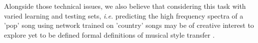 \documentclass{article}
\begin{document}



Alongside those technical issues, we also believe that considering this task with varied learning and testing sets, \textit{i.e.} predicting the high frequency spectra of a 'pop' song using network trained on 'country' songs may be of creative interest to explore yet to be defined formal definitions of musical style transfer \cite{dai2018music}.


\vfill\pagebreak




\end{document}
